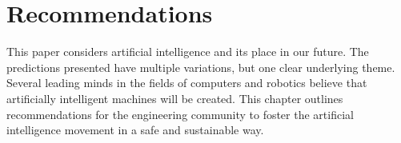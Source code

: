 \chapter{Recommendations}


This paper considers artificial intelligence and its place in our future. The
predictions presented have multiple variations, but one clear underlying theme. Several
leading minds in the fields of computers and robotics believe that artificially intelligent
machines will be created. This chapter outlines recommendations for the engineering
community to foster the artificial intelligence movement in a safe and sustainable way.

